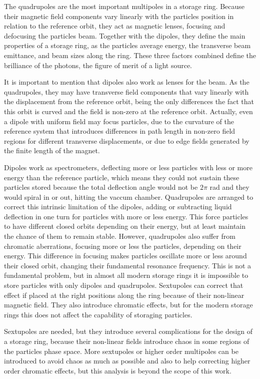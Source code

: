 \documentclass[
	12pt,				%
	openright,			%
	oneside,			%
	a4paper,		%
	chapter=TITLE,		%
	section=TITLE,		%
    brazil,				%
	english,			%
	sumario=tradicional,
	]{abntex2}
\begin{document}
    The quadrupoles are the most important multipoles in a storage ring. Because their magnetic field components vary linearly with the particles position in relation to the reference orbit, they act as magnetic lenses, focusing and defocusing the particles beam. Together with the dipoles, they define the main properties of a storage ring, as the particles average energy, the transverse beam emittance, and beam sizes along the ring. These three factors combined define the brilliance of the photons, the figure of merit of a light source.

    It is important to mention that dipoles also work as lenses for the beam. As the quadrupoles, they may have transverse field components that vary linearly with the displacement from the reference orbit, being the only differences the fact that this orbit is curved and the field is non-zero at the reference orbit. Actually, even a dipole with uniform field may focus particles, due to the curvature of the reference system that introduces differences in path length in non-zero field regions for different transverse displacements, or due to edge fields generated by the finite length of the magnet.

    Dipoles work as spectrometers, deflecting more or less particles with less or more energy than the reference particle, which means they could not sustain these particles stored because the total deflection angle would not be $2\pi$ rad and they would spiral in or out, hitting the vaccum chamber. Quadrupoles are arranged to correct this intrinsic limitation of the dipoles, adding or subtracting liquid deflection in one turn for particles with more or less energy. This force particles to have different closed orbits depending on their energy, but at least maintain the chance of them to remain stable. However, quadrupoles also suffer from chromatic aberrations, focusing more or less the particles, depending on their energy. This difference in focusing makes particles oscillate more or less around their closed orbit, changing their fundamental resonance frequency. This is not a fundamental problem, but in almost all modern storage rings it is impossible to store particles with only dipoles and quadrupoles. Sextupoles can correct that effect if placed at the right positions along the ring because of their non-linear magnetic field. They also introduce chromatic effects, but for the modern storage rings this does not affect the capability of storaging particles.

    Sextupoles are needed, but they introduce several complications for the design of a storage ring, because their non-linear fields introduce chaos in some regions of the particles phase space. More sextupoles or higher order multipoles can be introduced to avoid chaos as much as possible and also to help correcting higher order chromatic effects, but this analysis is beyond the scope of this work.
\end{document}
